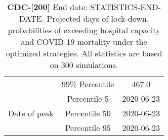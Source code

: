 \documentclass{article}
\begin{document}
\begin{table}[!htb]
\begin{tabular}{p{4cm}cc}
& 99\% Percentile     & 467.0    \\ \cmidrule(l){2-3} 		
\multirow{3}{\hsize}{Date of peak}   & Percentile 5      & 2020-06-23   \\ \cmidrule(l){2-3} 
                                     & Percentile 50     & 2020-06-23    \\ \cmidrule(l){2-3} 
                                     & Percentile 95     & 2020-06-23     \\  \bottomrule
\end{tabular}
\caption{\textbf{CDC-[200]}
	End date: STATISTICS-END-DATE. Projected days of lock-down, probabilities of exceeding hospital capacity and COVID-19 mortality under the optimized strategies. All statistics are based on 300 simulations.}
\label{table:summary_table}
\end{table}
\end{document}

